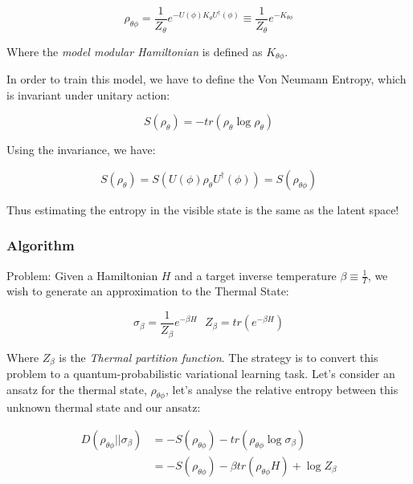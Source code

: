 \begin{equation*}
    \rho_{\theta \phi} = \frac{1}{Z_\theta} e^{- U(\phi) K_\theta U^\dagger (\phi)} \equiv \frac{1}{Z_\theta} e^{- K_{\theta \phi}}
\end{equation*}

Where the \textit{model modular Hamiltonian} is defined as $K_{\theta \phi}$. 

In order to train this model, we have to define the Von Neumann Entropy, which is invariant under unitary action:

\begin{equation*}
    S( \rho_\theta) = - tr ( \rho_\theta \log \rho_\theta )
\end{equation*}

Using the invariance, we have:

\begin{equation*}
    S ( \rho_\theta ) = S( U(\phi) \rho_\theta U^\dagger (\phi) ) = S ( \rho_{\theta \phi} )
\end{equation*}

Thus estimating the entropy in the visible state is the same as the latent space!

\subsubsection{Algorithm}
\label{Subsubsec: VQT algorithm}
Problem: Given a Hamiltonian $H$ and a target inverse temperature $\beta \equiv \frac{1}{T}$, we wish to generate an approximation to the Thermal State:

\begin{equation*}
    \sigma_{\beta} = \frac{1}{Z_\beta} e^{- \beta H} \ \ \ Z_\beta = tr( e^{- \beta H} )
\end{equation*}

Where $Z_\beta$ is the \textit{Thermal partition function}. The strategy is to convert this problem to a quantum-probabilistic variational learning task. Let's consider an ansatz for the thermal state, $\rho_{\theta \phi}$, let's analyse the relative entropy between this unknown thermal state and our ansatz:

\begin{equation*}
\begin{split}
    D( \rho_{\theta \phi} || \sigma_\beta ) & = - S( \rho_{\theta \phi} ) - tr( \rho_{\theta \phi} \log \sigma_\beta ) \\ 
    & = - S( \rho_{\theta \phi} ) - \beta tr( \rho_{\theta \phi} H ) + \log Z_\beta
\end{split}
\end{equation*}

